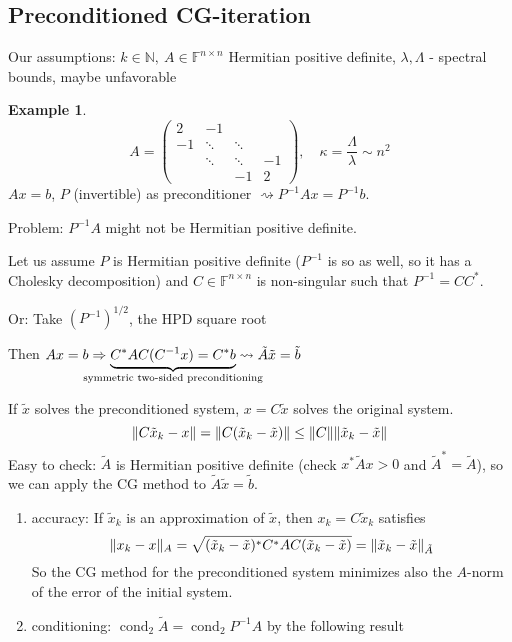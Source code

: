 \documentclass[12pt]{article}
\theoremstyle{definition}
\newtheorem*{example*}{Example}
\theoremstyle{remark}
\numberwithin{equation}{section}
\newcommand{\F}{\mathbb{F}}
\newcommand{\N}{\mathbb{N}}
\DeclarePairedDelimiter{\norm}{\lVert}{\rVert}
\DeclareMathOperator{\cond}{cond}
\begin{document}
\subsection{Preconditioned CG-iteration}
Our assumptions: $k \in \N,\ A \in \F^{n\times n}$ Hermitian positive definite, $\lambda,\Lambda$ - spectral bounds, maybe unfavorable
\begin{example*}
  \begin{equation*}
    A =
    \begin{pmatrix}
      2  & -1 &&\\
      -1 & \ddots & \ddots & \\
      & \ddots & \ddots &-1 \\
      & & -1 & 2
    \end{pmatrix}
    ,\quad \kappa = \frac{\Lambda}{\lambda} \sim n^2
  \end{equation*}
  $Ax = b$, $P$ (invertible) as preconditioner $\rightsquigarrow P^{-1} A x = P^{-1} b$.

  Problem: $P^{-1} A$ might not be Hermitian positive definite.

  Let us assume $P$ is Hermitian positive definite ($P^{-1}$ is so as well, so it has a Cholesky decomposition) and $C \in \F^{n\times n}$ is non-singular such that $P^{-1} = CC^*$.

  Or: Take $(P^{-1})^{1/2}$, the HPD square root

  Then $Ax = b \Rightarrow \underbrace{C^* A C (C^{-1} x) = C^* b}_{\mathclap{\text{symmetric two-sided preconditioning}}} \rightsquigarrow \tilde{A} \tilde{x} = \tilde{b}$

  If $\tilde{x}$ solves the preconditioned system, $x = C \tilde{x}$ solves the original system.
  \begin{equation*}
    \norm{C \tilde{x}_k - x} = \norm{C(\tilde{x}_k - \tilde{x})} \leq \norm{C} \norm{\tilde{x}_k - \tilde{x}}
  \end{equation*}
  Easy to check: $\tilde{A}$ is Hermitian positive definite (check $x^*\tilde{A}x > 0$ and $\tilde{A}^* = \tilde{A}$), so we can apply the CG method to $\tilde{A} \tilde{x} = \tilde{b}$.
  \begin{enumerate}[label=(\roman*)]
    \item accuracy: If $\tilde{x}_k$ is an approximation of $\tilde{x}$, then $x_k = C \tilde{x}_k$ satisfies
      \begin{equation*}
        \norm{x_k - x}_A = \sqrt{(\tilde{x}_k - \tilde{x})^* C^* A C (\tilde{x}_k - \tilde{x})} = \norm{\tilde{x}_k - \tilde{x}}_{\tilde{A}}
      \end{equation*}
      So the CG method for the preconditioned system minimizes also the $A$-norm of the error of the initial system.
    \item conditioning: $\cond_2 \tilde{A} = \cond_2 P^{-1} A$ by the following result
  \end{enumerate}
\end{example*}
\end{document}
